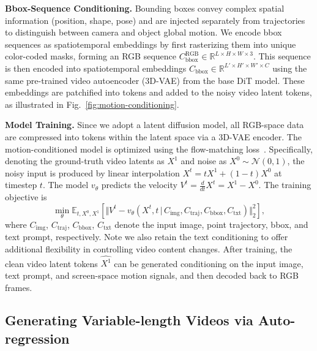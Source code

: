 \textbf{Bbox-Sequence Conditioning.}
Bounding boxes convey complex spatial information (position, shape, pose) and are injected separately from trajectories to distinguish between camera and object global motion. 
We encode bbox sequences as spatiotemporal embeddings by first rasterizing them into unique color-coded masks, forming an RGB sequence $C_\text{bbox}^\text{RGB}\in \mathbb{R}^{L\times H\times W\times 3}$.
This sequence is then encoded into spatiotemporal embeddings $C_\text{bbox}\in \mathbb{R}^{L'\times H'\times W'\times C}$ using the same pre-trained video autoencoder (3D-VAE) from the base DiT model. These embeddings are patchified into tokens and added to the noisy video latent tokens, as illustrated in Fig.~\ref{fig:motion-conditioning}.

\textbf{Model Training.}
Since we adopt a latent diffusion model, all RGB-space data are compressed into tokens within the latent space via a 3D-VAE encoder. The motion-conditioned model is optimized using the flow-matching loss~\cite{lipmanflow,liu2023instaflow}. Specifically, denoting the ground-truth video latents as $X^1$ and noise as $X^0\sim\mathcal{N}(0,1)$, the noisy input is produced by linear interpolation $X^t=t X^1+(1-t)X^0$ at timestep $t$. The model $v_{\theta}$ predicts the velocity $V^t=\frac{d}{dt}X^t=X^1-X^0$. The training objective is
\begin{equation}
    \min _{\theta} \mathbb{E}_{t,X^0,X^1} \left[\Vert V^t -v_{\theta}(X^t,t \,|\, C_\text{img},C_\text{traj},C_\text{bbox},C_\text{txt})   \Vert_2^2 \right],
\end{equation}
where $C_\text{img}$, $C_\text{traj}$, $C_\text{bbox}$, $C_\text{txt}$ denote the input image, point trajectory, bbox, and text prompt, respectively.
Note we also retain the text conditioning to offer additional flexibility in controlling video content changes. After training, the clean video latent tokens $\hat{X^1}$ can be generated conditioning on the input image, text prompt, and screen-space motion signals, and then decoded back to RGB frames.


\subsection{Generating Variable-length Videos via Auto-regression}


